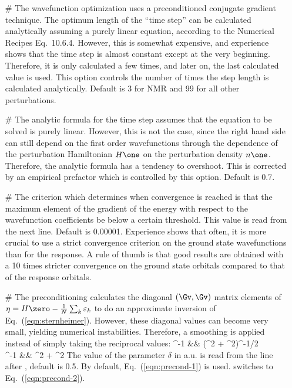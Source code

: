 \documentclass[twoside,10pt,titlepage,a4paper]{article}
\begin{document}
\begin{itemize}

\item[\#] 
The wavefunction optimization uses a preconditioned conjugate gradient
technique. The optimum length of the ``time step'' can be calculated
analytically assuming a purely linear equation, according to the
Numerical Recipes Eq.\ 10.6.4. However, this is somewhat expensive,
and experience shows that the time step is almost constant except at
the very beginning. Therefore, it is only calculated a few times, and
later on, the last calculated value is used. This option controls the
number of times the step length is calculated analytically. Default is
3 for NMR and 99 for all other perturbations.



\item[\#] 
The analytic formula for the time step assumes that the equation to be
solved is purely linear. However, this is not the case, since the
right hand side can still depend on the first order wavefunctions
through the dependence of the perturbation Hamiltonian $H\one$ on the
perturbation density $n\one$. Therefore, the analytic formula has a
tendency to overshoot. This is corrected by an empirical prefactor
which is controlled by this option. Default is 0.7.


\item[\#]  The criterion which determines
when convergence is reached is that the maximum element of the
gradient of the energy with respect to the wavefunction coefficients
be below a certain threshold. This value is read from the next
line. Default is 0.00001. Experience shows that often, it is more
crucial to use a strict convergence criterion on the ground state
wavefunctions than for the response. A rule of thumb is that good
results are obtained with a 10 times stricter convergence on the
ground state orbitals compared to that of the response orbitals.


\item[\#] 
The preconditioning calculates the diagonal $(\Gv,\Gv)$ matrix
elements of $\eta=H\zero-\frac 1N \sum_k\varepsilon_k$ to do an
approximate inversion of Eq.~(\ref{eqn:sternheimer}). However, these
diagonal values can become very small, yielding numerical
instabilities. Therefore, a smoothing is applied instead of simply
taking the reciprocal values:
\beq
  \eta^{-1} &\mapsto& \left(\eta^2 + \delta^2\right)^{-1/2}
  \label{eqn:precond-1}\\
  \eta^{-1} &\mapsto& \frac {\eta} {\eta^2 + \delta^2}
  \label{eqn:precond-2}
\eeq
The value of the parameter $\delta$ in a.u. is read from the line
after {}, default is 0.5. By default,
Eq.~(\ref{eqn:precond-1}) is used.  switches to
Eq.~(\ref{eqn:precond-2}).



\end{itemize}
\end{document}
